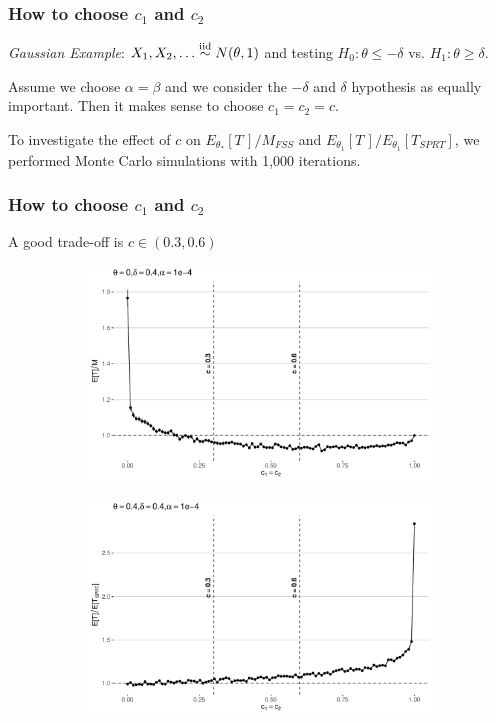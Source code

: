 \documentclass[10pt]{beamer}
\begin{document}
\begin{frame}
\frametitle{How to choose $c_1$ and $c_2$}
\textit{Gaussian Example}: $X_1, X_2, \dots  \overset{\text{iid}}\sim N(\theta, 1)$ and testing $H_0: \theta \leq -\delta$ vs. $H_1: \theta \geq \delta$.

Assume we choose $\alpha = \beta$ and we consider the $-\delta$ and $\delta$ hypothesis as equally important. Then it makes sense to choose $c_1 = c_2 = c$.

To investigate the effect of $c$ on $E_{\theta_{*}}[T\,] / M_{FSS}$ and $E_{\theta_1}[T\,] / E_{\theta_1}[T_{SPRT}]$, we performed Monte Carlo simulations with 1,000 iterations.

\end{frame}

\begin{frame}
\frametitle{How to choose $c_1$ and $c_2$}
A good trade-off is $c \in (0.3, 0.6)$

\begin{figure}
\centering
\begin{subfigure}{0.5\textwidth}
    \includegraphics[width=\textwidth]{images/trunc_v_fss}
\end{subfigure}
\hfill
\begin{subfigure}{0.5\textwidth}
    \includegraphics[width=\textwidth]{images/trunc_v_sprt}
\end{subfigure}
\end{figure}

\end{frame}
\end{document}
